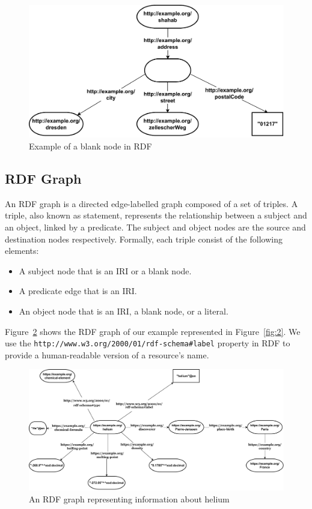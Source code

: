 \begin{figure}[h]
  \centering
  \includegraphics[width=0.80\linewidth]{images/blank_node.drawio.pdf}
  \caption{Example of a blank node in RDF}
  \label{fig:3}
\end{figure}

\subsection{RDF Graph}
\label{subsec:rdf-graph}
\begin{definition}	
An RDF graph is a directed edge-labelled graph composed of a set of triples. A triple, also known as statement, represents the relationship between a subject and an object, linked by a predicate. The subject and object nodes are the source and destination nodes respectively. Formally, each triple consist of the following elements:   

\begin{itemize}
	\item A subject node that is an IRI or a blank node.
	\item A predicate edge that is an IRI.
	\item An object node that is an IRI, a blank node, or a literal.
\end{itemize}	

\end{definition}

Figure~\ref{fig:4} shows the RDF graph of our example represented in Figure~\ref{fig:2}. We use the \texttt{http://www.w3.org/2000/01/rdf-schema\#label} property in RDF to provide a human-readable version of a resource's name.

\begin{figure}[h]
  \centering
  \includegraphics[width=\linewidth]{images/rdf_graph_updated.drawio.pdf}
  \caption{An RDF graph representing information about helium}
  \label{fig:4}
\end{figure}

